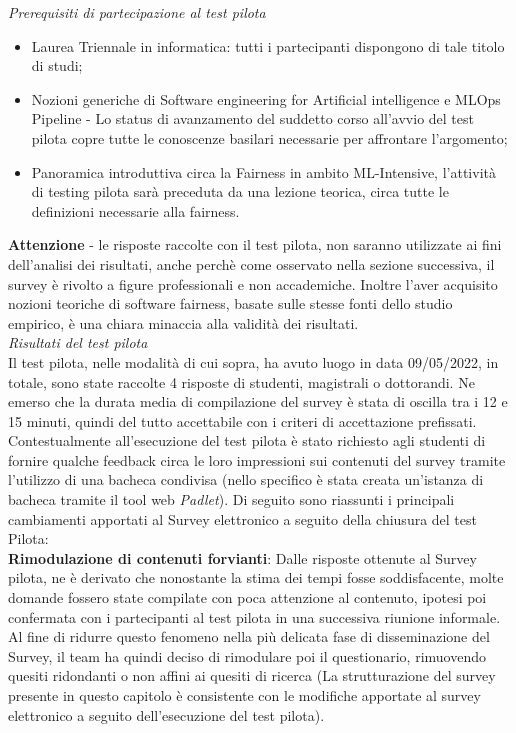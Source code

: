     \emph{Prerequisiti di partecipazione al test pilota}
    \begin{itemize}
        \item Laurea Triennale in informatica: tutti i partecipanti dispongono di tale titolo di studi;
        \item Nozioni generiche di Software engineering for Artificial intelligence e MLOps Pipeline - Lo status di avanzamento del suddetto corso all'avvio del test pilota copre tutte le conoscenze basilari necessarie per affrontare l'argomento;
        \item Panoramica introduttiva circa la Fairness in ambito ML-Intensive, l'attività di testing pilota sarà preceduta da una lezione teorica, circa tutte le definizioni necessarie alla fairness.
    \end{itemize}
    
   \textbf{ Attenzione } - le risposte raccolte con il test pilota, non saranno utilizzate ai fini dell'analisi dei risultati, anche perchè come osservato nella sezione successiva, il survey è rivolto a figure professionali e non accademiche. Inoltre l'aver acquisito nozioni teoriche di software fairness, basate sulle stesse fonti dello studio empirico, è una chiara minaccia alla validità dei risultati.\\
   
   \emph{Risultati del test pilota}\\
   Il test pilota, nelle modalità di cui sopra, ha avuto luogo in data 09/05/2022, in totale, sono state raccolte 4 risposte di studenti, magistrali o dottorandi. Ne emerso che la durata media di compilazione del survey è stata di oscilla tra i 12 e 15 minuti, quindi del tutto accettabile con i criteri di accettazione prefissati. Contestualmente all'esecuzione del test pilota è stato richiesto agli studenti di fornire qualche feedback circa le loro impressioni sui contenuti del survey tramite l'utilizzo di una bacheca condivisa (nello specifico è stata creata un'istanza di bacheca tramite il tool web \emph{Padlet}). Di seguito sono riassunti i principali cambiamenti apportati al Survey elettronico a seguito della chiusura del test Pilota:\\
   
   \textbf{Rimodulazione di contenuti forvianti}:
   Dalle risposte ottenute al Survey pilota, ne è derivato che nonostante la stima dei tempi fosse soddisfacente, molte domande fossero state compilate con poca attenzione al contenuto, ipotesi poi confermata con i partecipanti al test pilota in una successiva riunione informale. Al fine di ridurre questo fenomeno nella più delicata fase di disseminazione del Survey, il team ha quindi deciso di rimodulare poi il questionario, rimuovendo quesiti ridondanti o non affini ai quesiti di ricerca (La strutturazione del survey presente in questo capitolo è consistente con le modifiche apportate al survey elettronico a seguito dell'esecuzione del test pilota). \\
   
